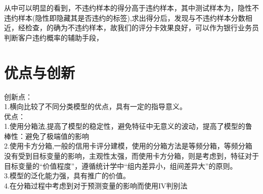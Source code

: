 \documentclass[12pt]{article}
\begin{document}
\begin{flushleft}
	\noindent\qquad 从中可以明显的看到，不违约样本的得分高于违约样本，其中测试样本为，隐性不违约样本(隐性即隐藏其是否违约的标签),求出得分后，发现与不违约样本分数相近，经检查，的确为不违约样本，故我们的评分卡效果良好，可以作为银行业务员判断客户违约概率的辅助手段，
	
\end{flushleft}








\section{优点与创新}

\begin{flushleft}
	
\noindent\qquad  创新点：\\
1.横向比较了不同分类模型的优点，具有一定的指导意义。\\
\noindent\qquad  优点：\\
1.使用分箱法,提高了模型的稳定性，避免特征中无意义的波动，提高了模型的鲁棒性：避免了极端值的影响\\

2.使用卡方分箱,一般的信用卡评分建模，使用的分箱方法是等频分箱，等频分箱没有受到目标变量的影响，主观性太强，而使用卡方分箱，则是考虑到，特征对于目标变量的“价值程度”，遵循统计学中“组内差异小，组间差异大”的原则。\\

3.模型的泛化能力强，具有推广的价值。\\

4.在分箱过程中考虑到对于预测变量的影响而使用IV判别法
\end{flushleft}



\newpage
\end{document}
